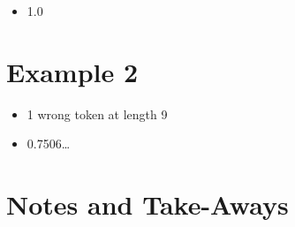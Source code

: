 \begin{itemize}
\tightlist
\item
  1.0
\end{itemize}

\hypertarget{example-2}{%
\section{Example 2}\label{example-2}}

\begin{Shaded}
\begin{Highlighting}[]
\OperatorTok{=}\NormalTok{ [}
\NormalTok{  [}\NormalTok{, }\NormalTok{, }\NormalTok{, }\NormalTok{,}
  \NormalTok{, }\NormalTok{, }\NormalTok{, }\NormalTok{, }\NormalTok{]}
\NormalTok{]}
\OperatorTok{=}
\NormalTok{  [}\NormalTok{, }\NormalTok{, }\NormalTok{, }\NormalTok{,}
  \NormalTok{, }\NormalTok{, }\NormalTok{, }\NormalTok{, }\NormalTok{]}
\end{Highlighting}
\end{Shaded}

\begin{itemize}
\item
  1 wrong token at length 9
\item
  0.7506\ldots{}
\end{itemize}

\hypertarget{notes-and-take-aways}{%
\section{Notes and Take-Aways}\label{notes-and-take-aways}}

